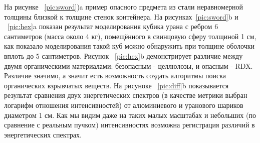 \documentclass[a4paper]{panl}
\begin{document}
На рисунке ~\ref{pic:sword})a пример опасного предмета из стали неравномерной толщины близкой к толщине стенок контейнера. На рисунках~\ref{pic:sword}b и ~\ref{pic:hex}a  показан результат  моделирования кубика урана с ребром 6 сантиметров (масса около 4 кг), помещённого в свинцовую сферу толщиной 1 см, как показало моделирования такой куб можно обнаружить при толщине оболочки вплоть до 5 сантиметров. Рисунок ~\ref{pic:hex}b демонстрирует различие между двумя органическими материалами: безопасным - целлюлозы, и опасным  - RDX. Различие значимо, а значит есть возможность создать алгоритмы поиска органических взрывчатых веществ. На рисуноке ~\ref{pic:diff}b  показывается результат сравнения двух энергетических спектров (в  качестве метрики выбран логарифм отношения интенсивностей) от алюминиевого и уранового шариков диаметром 1 см. Как мы видим даже на таких малых масштабах и небольших (по сравнение с реальным пучком) интенсивностях возможна регистрация различий в энергетических спектрах.
\end{document}
